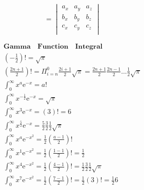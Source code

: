 \documentclass{article}
\begin{document}
\begin{displaymath}
    [\overrightarrow{abc}]= 
    \begin{vmatrix}
        a_{x} & a_{y} & a_{z} \\
        b_{x} & b_{y} & b_{z} \\
        c_{x} & c_{y} & c_{z} \\
    \end{vmatrix}
\end{displaymath}

\clearpage 

\begin{align*}
    \bm{Gamma \quad Function \quad Integral} \\ 
    \left(-\frac{1}{2}\right)! = \sqrt{\pi} \\ 
    \left(\frac{2n+1}{2}\right)! = \Pi_{i=n}^{0}{\frac{2i+1}{2}}\sqrt{\pi} = \frac{2n+1}{2}\frac{2n-1}{2}\dots\frac{1}{2}\sqrt{\pi} \\ 
    \int_{0}^{\infty} x^{a}\mathrm{e}^{-x} = a! \\
    \int_{0}^{\infty} x^{-\frac{1}{2}}\mathrm{e}^{-x} = \sqrt{\pi}\\ 
    \int_{0}^{\infty} x^{3}\mathrm{e}^{-x} = (3)! = 6 \\ 
    \int_{0}^{\infty} x^{\frac{5}{2}}\mathrm{e}^{-x} = \frac{5}{2}\frac{3}{2}\frac{1}{2}\sqrt{\pi}\\  
    \int_{0}^{\infty} x^{a}\mathrm{e}^{-x^2} = \frac{1}{2} \left(\frac{a-1}{2}\right)! \\ 
    \int_{0}^{\infty} x^{1}\mathrm{e}^{-x^2} = \frac{1}{2} \left(\frac{1-1}{2}\right)! = \frac{1}{2} \\
    \int_{0}^{\infty} x^{4}\mathrm{e}^{-x^2} = \frac{1}{2} \left(\frac{4-1}{2}\right)! = \frac{1}{2}\frac{3}{2}\frac{1}{2}\sqrt{\pi}\\ 
    \int_{0}^{\infty} x^{7}\mathrm{e}^{-x^2} = \frac{1}{2} \left(\frac{7-1}{2}\right)! = \frac{1}{2}(3)! = \frac{1}{2}6\\
\end{align*}

\cleardoublepage
\end{document}
